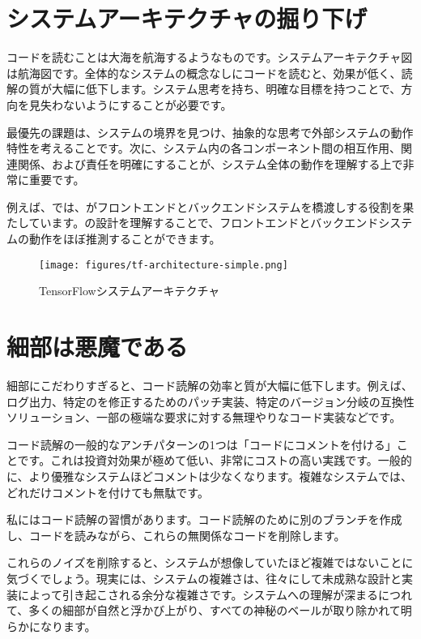 \section{システムアーキテクチャの掘り下げ}

\begin{content}

コードを読むことは大海を航海するようなものです。システムアーキテクチャ図は航海図です。全体的なシステムの概念なしにコードを読むと、効果が低く、読解の質が大幅に低下します。システム思考を持ち、明確な目標を持つことで、方向を見失わないようにすることが必要です。

最優先の課題は、システムの境界を見つけ、抽象的な思考で外部システムの動作特性を考えることです。次に、システム内の各コンポーネント間の相互作用、関連関係、および責任を明確にすることが、システム全体の動作を理解する上で非常に重要です。

例えば、では、がフロントエンドとバックエンドシステムを橋渡しする役割を果たしています。の設計を理解することで、フロントエンドとバックエンドシステムの動作をほぼ推測することができます。

\begin{figure}[!h]
\centering
\texttt{[image: figures/tf-architecture-simple.png]}
\caption{TensorFlowシステムアーキテクチャ}
 \label{fig:tf-architecture-simple}
\end{figure}

\end{content}

\section{細部は悪魔である}

\begin{content}

細部にこだわりすぎると、コード読解の効率と質が大幅に低下します。例えば、ログ出力、特定のを修正するためのパッチ実装、特定のバージョン分岐の互換性ソリューション、一部の極端な要求に対する無理やりなコード実装などです。

コード読解の一般的なアンチパターンの1つは「コードにコメントを付ける」ことです。これは投資対効果が極めて低い、非常にコストの高い実践です。一般的に、より優雅なシステムほどコメントは少なくなります。複雑なシステムでは、どれだけコメントを付けても無駄です。

私にはコード読解の習慣があります。コード読解のために別のブランチを作成し、コードを読みながら、これらの無関係なコードを削除します。

\begin{leftbar}
\end{leftbar}

これらのノイズを削除すると、システムが想像していたほど複雑ではないことに気づくでしょう。現実には、システムの複雑さは、往々にして未成熟な設計と実装によって引き起こされる余分な複雑さです。システムへの理解が深まるにつれて、多くの細部が自然と浮かび上がり、すべての神秘のベールが取り除かれて明らかになります。

\end{content}

